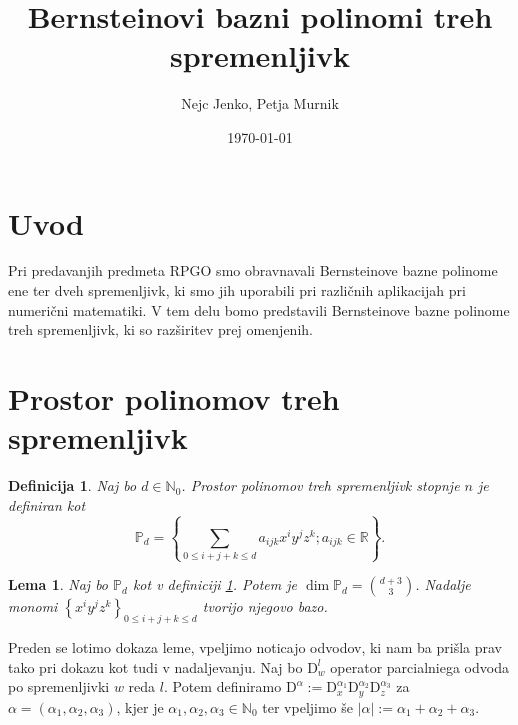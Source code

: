 \documentclass[11pt,a4paper]{article}
\title{\textbf{Bernsteinovi bazni polinomi treh spremenljivk}}
\author{Nejc Jenko, Petja Murnik}
\date{\today}
\newtheorem{definition}{Definicija}
\newtheorem{lemma}{Lema}
\begin{document}
\maketitle
\break

\section{Uvod}

Pri predavanjih predmeta RPGO smo obravnavali Bernsteinove bazne polinome ene
ter dveh spremenljivk, ki smo jih uporabili pri različnih aplikacijah pri numerični matematiki.
V tem delu bomo predstavili Bernsteinove bazne polinome treh spremenljivk, ki so 
razširitev prej omenjenih. 

\section{Prostor polinomov treh spremenljivk} 

\begin{definition}\label{def_prostor}
    Naj bo $d \in \mathbb{N}_0$. Prostor polinomov treh spremenljivk stopnje $n$ je definiran kot
    \begin{equation}
        \mathbb{P}_d = \left\{ \sum_{0 \le i  + j + k \le d} a_{ijk} x^i y^j z^k  ; a_{ijk} \in \mathbb{R}\right\}.
    \end{equation}
\end{definition}

\begin{lemma}
    Naj bo $\mathbb{P}_d$ kot v definiciji \ref{def_prostor}.
    Potem je $\dim \mathbb{P}_d = \binom{d+3}{3} $. 
    Nadalje monomi $\left\{x^i y^j z^k \right\}_{0 \le i  + j + k \le d}$ tvorijo njegovo bazo.
\end{lemma}

Preden se lotimo dokaza leme, vpeljimo noticajo odvodov, 
ki nam ba prišla prav tako pri dokazu kot tudi 
v nadaljevanju. Naj bo $\text{D}^l_w$ operator parcialniega odvoda po
spremenljivki $w$ reda $l$. Potem definiramo 
$\text{D}^\alpha := \text{D}^{\alpha_1}_x \text{D}^{\alpha_2}_y \text{D}^{\alpha_3}_z$
za $\alpha = \left(\alpha_1 , \alpha_2 , \alpha_3 \right)$,
kjer je $\alpha_1,\alpha_2, \alpha_3 \in \mathbb{N}_0$ 
ter vpeljimo še $|\alpha| := \alpha_1 + \alpha_2 + \alpha_3$.
\end{document}

